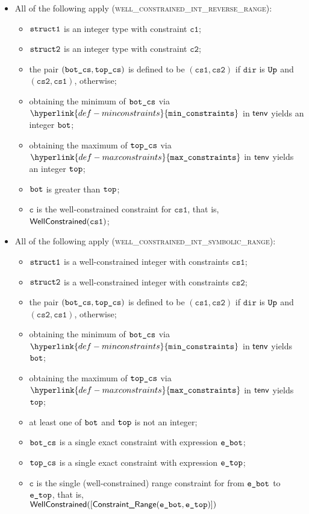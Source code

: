 \documentclass{book}
\newcommand\minconstraints[0]{\hyperlink{def-minconstraints}{\texttt{min\_constraints}}}
\newcommand\maxconstraints[0]{\hyperlink{def-maxconstraints}{\texttt{max\_constraints}}}
\newcommand\vc[0]{\texttt{c}}
\newcommand\vcone[0]{\texttt{c1}}
\newcommand\vctwo[0]{\texttt{c2}}
\newcommand\dir[0]{\texttt{dir}}
\newcommand\csone[0]{\texttt{cs1}}
\newcommand\cstwo[0]{\texttt{cs2}}
\begin{document}
\begin{itemize}
  \item All of the following apply (\textsc{well\_constrained\_int\_reverse\_range}):
  \begin{itemize}
    \item $\texttt{struct1}$ is an integer type with constraint $\vcone$;
    \item $\texttt{struct2}$ is an integer type with constraint $\vctwo$;
    \item the pair $(\texttt{bot\_cs}, \texttt{top\_cs})$ is defined to be $(\csone, \cstwo)$ if $\dir$ is $\texttt{Up}$ and $(\cstwo, \csone)$, otherwise;
    \item obtaining the minimum of $\texttt{bot\_cs}$ via $\minconstraints$ in $\textsf{tenv}$ yields an integer $\texttt{bot}$;
    \item obtaining the maximum of $\texttt{top\_cs}$ via $\maxconstraints$ in $\textsf{tenv}$ yields an integer $\texttt{top}$;
    \item $\texttt{bot}$ is greater than $\texttt{top}$;
    \item $\vc$ is the well-constrained constraint for $\csone$, that is, \\
          $\wellconstrained(\csone)$;
  \end{itemize}

  \item All of the following apply (\textsc{well\_constrained\_int\_symbolic\_range}):
  \begin{itemize}
    \item $\texttt{struct1}$ is a well-constrained integer with constraints $\csone$;
    \item $\texttt{struct2}$ is a well-constrained integer with constraints $\cstwo$;
    \item the pair $(\texttt{bot\_cs}, \texttt{top\_cs})$ is defined to be $(\csone, \cstwo)$ if $\dir$ is $\texttt{Up}$ and $(\cstwo, \csone)$, otherwise;
    \item obtaining the minimum of $\texttt{bot\_cs}$ via $\minconstraints$ in $\textsf{tenv}$ yields $\texttt{bot}$;
    \item obtaining the maximum of $\texttt{top\_cs}$ via $\maxconstraints$ in $\textsf{tenv}$ yields $\texttt{top}$;
    \item at least one of $\texttt{bot}$ and $\texttt{top}$ is not an integer;
    \item $\texttt{bot\_cs}$ is a single exact constraint with expression $\texttt{e\_bot}$;
    \item $\texttt{top\_cs}$ is a single exact constraint with expression $\texttt{e\_top}$;
    \item $\vc$ is the single (well-constrained) range constraint for from $\texttt{e\_bot}$ to $\texttt{e\_top}$, that is, \\
          $\textsf{WellConstrained}([\textsf{Constraint\_Range}(\texttt{e\_bot}, \texttt{e\_top})])$
  \end{itemize}


\end{itemize}
\end{document}
